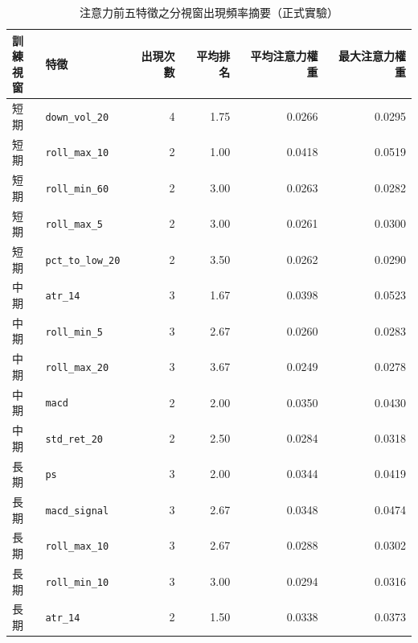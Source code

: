 \begin{table}[H]
\centering
\caption{注意力前五特徵之分視窗出現頻率摘要（正式實驗）}
\label{tab:results_dmfm_attention}
\begingroup
\scriptsize
\setlength{\tabcolsep}{4pt}
\renewcommand{\arraystretch}{1.10}
\begin{adjustbox}{max width=\textwidth}
\begin{tabular}{@{}llrrrr@{}}
\toprule
\makecell[l]{訓練\\視窗} & 特徵 & 出現次數 & 平均排名 & 平均注意力權重 & 最大注意力權重 \\
\midrule
短期 & \texttt{down\_vol\_20} & 4 & 1.75 & 0.0266 & 0.0295 \\
短期 & \texttt{roll\_max\_10} & 2 & 1.00 & 0.0418 & 0.0519 \\
短期 & \texttt{roll\_min\_60} & 2 & 3.00 & 0.0263 & 0.0282 \\
短期 & \texttt{roll\_max\_5} & 2 & 3.00 & 0.0261 & 0.0300 \\
短期 & \texttt{pct\_to\_low\_20} & 2 & 3.50 & 0.0262 & 0.0290 \\
\midrule
中期 & \texttt{atr\_14} & 3 & 1.67 & 0.0398 & 0.0523 \\
中期 & \texttt{roll\_min\_5} & 3 & 2.67 & 0.0260 & 0.0283 \\
中期 & \texttt{roll\_max\_20} & 3 & 3.67 & 0.0249 & 0.0278 \\
中期 & \texttt{macd} & 2 & 2.00 & 0.0350 & 0.0430 \\
中期 & \texttt{std\_ret\_20} & 2 & 2.50 & 0.0284 & 0.0318 \\
\midrule
長期 & \texttt{ps} & 3 & 2.00 & 0.0344 & 0.0419 \\
長期 & \texttt{macd\_signal} & 3 & 2.67 & 0.0348 & 0.0474 \\
長期 & \texttt{roll\_max\_10} & 3 & 2.67 & 0.0288 & 0.0302 \\
長期 & \texttt{roll\_min\_10} & 3 & 3.00 & 0.0294 & 0.0316 \\
長期 & \texttt{atr\_14} & 2 & 1.50 & 0.0338 & 0.0373 \\
\bottomrule
\end{tabular}
\end{adjustbox}
\endgroup
\end{table}
